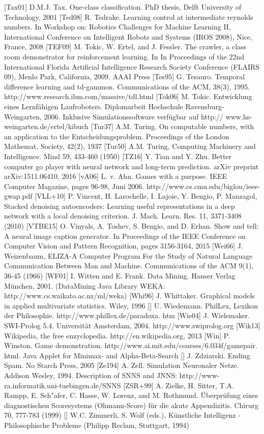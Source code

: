 \documentclass[10pt]{book}
\begin{document}
\begin{center}
[Tax01] D.M.J. Tax. One-class classification. PhD thesis, Delft University of Technology, 2001
[Ted08] R. Tedrake. Learning control at intermediate reynolds numbers. In Workshop on: Robotics Challenges for Machine Learning II, International Conference on Intelligent Robots and Systems (IROS 2008), Nice, France, 2008
[TEF09] M. Tokic, W. Ertel, and J. Fessler. The crawler, a class room demonstrator for reinforcement learning. In In Proceedings of the 22nd International Florida Artificial Intelligence Research Society Conference (FLAIRS 09), Menlo Park, California, 2009. AAAI Press
[Tes95] G. Tesauro. Temporal difference learning and td-gammon. Communications of the ACM, 38(3), 1995. http://www.research.ibm.com/massive/tdl.html
[Tok06] M. Tokic. Entwicklung eines Lernfähigen Laufroboters. Diplomarbeit Hochschule Ravensburg-Weingarten, 2006. Inklusive Simulationssoftware verfügbar auf http:// www.hs-weingarten.de/ertel/kibuch
[Tur37] A.M. Turing. On computable numbers, with an application to the Entscheidungsproblem. Proceedings of the London Mathemat. Society, 42(2), 1937
[Tur50] A.M. Turing, Computing Machinery and Intelligence. Mind 59, 433-460 (1950)
[TZ16] Y. Tian and Y. Zhu. Better computer go player with neural network and long-term prediction. arXiv preprint arXiv:1511.06410, 2016
[vA06] L. v. Ahn. Games with a purpose. IEEE Computer Magazine, pages 96-98, Juni 2006. http://www.cs.cmu.edu/biglou/ieee-gwap.pdf
[VLL+10] P. Vincent, H. Larochelle, I. Lajoie, Y. Bengio, P. Manzagol, Stacked denoising autoencoders: Learning useful representations in a deep network with a local denoising criterion. J. Mach. Learn. Res. 11, 3371-3408 (2010)
[VTBE15] O. Vinyals, A. Toshev, S. Bengio, and D. Erhan. Show and tell: A neural image caption generator. In Proceedings of the IEEE Conference on Computer Vision and Pattern Recognition, pages 3156-3164, 2015
[Wei66] J. Weizenbaum, ELIZA-A Computer Program For the Study of Natural Language Communication Between Man and Machine. Communications of the ACM 9(1), 36-45 (1966)
[WF01] I. Witten and E. Frank. Data Mining. Hanser Verlag München, 2001. (DataMining Java Library WEKA: http://www.cs.waikato.ac.nz/ml/weka)
[Whi96] J. Whittaker. Graphical models in applied multivariate statistics. Wiley, 1996
[\cite{wie}] U. Wiedemann. PhilLex, Lexikon der Philosophie. http://www.phillex.de/paradoxa. htm
[Wie04] J. Wielemaker. SWI-Prolog 5.4. Universität Amsterdam, 2004. http://www.swiprolog.org
[Wik13] Wikipedia, the free enzyclopedia. http://en.wikipedia.org, 2013
[Win] P. Winston. Game demonstration. http://www.ai.mit.edu/courses/6.034f/gamepair. html. Java Applet for Minimax- and Alpha-Beta-Search
[\cite{zdz05}] J. Zdziarski. Ending Spam. No Starch Press, 2005
[Ze194] A. Zell. Simulation Neuronaler Netze. Addison Wesley, 1994. Description of SNNS and JNNS: http://www-ra.informatik.uni-tuebingen.de/SNNS
[ZSR+99] A. Zielke, H. Sitter, T.A. Rampp, E. Sch"afer, C. Hasse, W. Lorenz, and M. Rothmund. Überprüfung eines diagnostischen Scoresystems (Ohmann-Score) für die akute Appendizitis. Chirurg 70, 777-783 (1999)
[\cite{zw94}] W.C. Zimmerli, S. Wolf (eds.), Künstliche Intelligenz - Philosophische Probleme (Philipp Reclam, Stuttgart, 1994)

\end{center}
\end{document}
